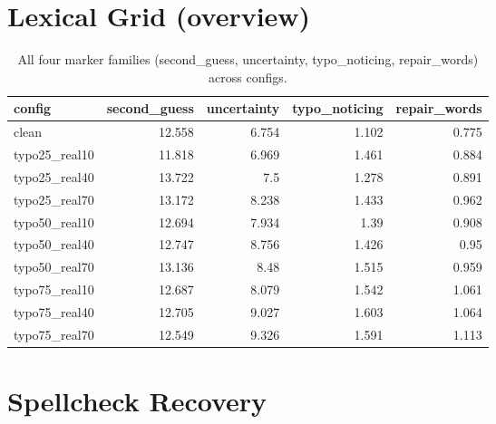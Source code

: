 \documentclass[11pt]{article}
\begin{document}
\section*{Lexical Grid (overview)}
\begin{table}[H]
\centering
\caption{All four marker families (second\_guess, uncertainty, typo\_noticing, repair\_words) across configs.}
\small
\begin{adjustbox}{max width=\textwidth}
\begin{tabular}{lrrrr}
\toprule
\textbf{config} & \textbf{second\_guess} & \textbf{uncertainty} & \textbf{typo\_noticing} & \textbf{repair\_words} \\
\midrule
clean & 12.558 & 6.754 & 1.102 & 0.775 \\
typo25\_real10 & 11.818 & 6.969 & 1.461 & 0.884 \\
typo25\_real40 & 13.722 & 7.5 & 1.278 & 0.891 \\
typo25\_real70 & 13.172 & 8.238 & 1.433 & 0.962 \\
typo50\_real10 & 12.694 & 7.934 & 1.39 & 0.908 \\
typo50\_real40 & 12.747 & 8.756 & 1.426 & 0.95 \\
typo50\_real70 & 13.136 & 8.48 & 1.515 & 0.959 \\
typo75\_real10 & 12.687 & 8.079 & 1.542 & 1.061 \\
typo75\_real40 & 12.705 & 9.027 & 1.603 & 1.064 \\
typo75\_real70 & 12.549 & 9.326 & 1.591 & 1.113 \\
\bottomrule
\end{tabular}
\end{adjustbox}
\end{table}

\section*{Spellcheck Recovery}

\end{document}
